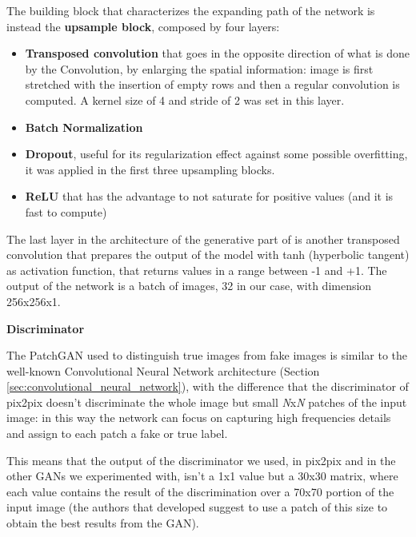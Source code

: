 \vspace{2mm} %
The building block that characterizes the expanding path of the network is instead the \textbf{upsample block}, composed by four layers:

\begin{itemize}
\item \textbf{Transposed convolution} that goes in the opposite direction of what is done by the Convolution, by enlarging the spatial information: image is first stretched with the insertion of empty rows and then a regular convolution is computed. A kernel size of 4 and stride of 2 was set in this layer.
\item \textbf{Batch Normalization}
\item \textbf{Dropout}, useful for its regularization effect against some possible overfitting, it was applied in the first three upsampling blocks.
\item \textbf{ReLU} that has the advantage to not saturate for positive values (and it is fast to compute) \cite[p.~720]{hands_on_ml}
\end{itemize}

The last layer in the architecture of the generative part of \cite{pix2pix} is another transposed convolution that prepares the output of the model with tanh (hyperbolic tangent) as activation function, that returns values in a range between -1 and +1.
The output of the network is a batch of images, 32 in our case, with dimension 256x256x1.

\vspace{6mm} 
\noindent\textbf{Discriminator}

\vspace{2mm}
\noindent The PatchGAN \cite{patchgan} used to distinguish true images from fake images is similar to the well-known Convolutional Neural Network architecture (Section \ref{sec:convolutional_neural_network}), with the difference that the discriminator of pix2pix doesn't discriminate the whole image but small \textit{N}x\textit{N} patches of the input image: in this way the network can focus on capturing high frequencies details and assign to each patch a fake or true label. 

This means that the output of the discriminator we used, in pix2pix and in the other \ac{GAN}s we experimented with, isn't a 1x1 value but a 30x30 matrix, where each value contains the result of the discrimination over a 70x70 portion of the input image (the authors that developed \cite{pix2pix} suggest to use a patch of this size to obtain the best results from the \ac{GAN}).

